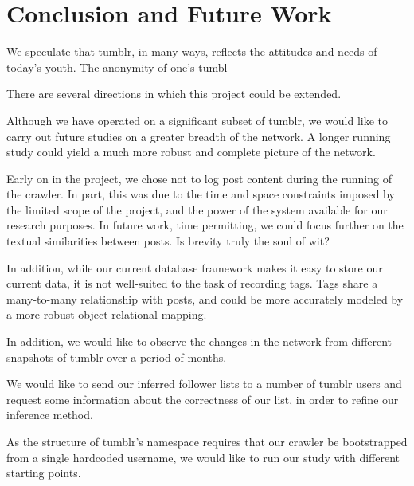\section{Conclusion and Future Work}
\label{sec:-conc}

We speculate that tumblr, in many ways, reflects the attitudes and 
needs of today's youth.  The anonymity of one's tumbl


There are several directions in which this project could be extended.


Although we have operated on a significant subset of tumblr, we
would like to carry out future studies on a greater breadth of the 
network.  A longer running study could yield a much more robust and 
complete picture of the network.

Early on in the project, we chose not to log post content during the 
running of the crawler.  In part, this was due to the time and space 
constraints imposed by the limited scope of the project, and the power 
of the system available for our research purposes.  In future work, 
time permitting, we could focus further on the textual similarities 
between posts.  Is brevity truly the soul of wit?

In addition, while our current database framework makes it easy to store 
our current data, it is not well-suited to the task of recording tags.  
Tags share a many-to-many relationship with posts, and could be more 
accurately modeled by a more robust object relational mapping.


In addition, we would like to observe the changes in the network from 
different snapshots of tumblr over a period of months.

We would like to send our inferred follower lists to a number of 
tumblr users and request some information about the correctness of our 
list, in order to refine our inference method.

As the structure of tumblr's namespace requires that our crawler be 
bootstrapped from a single hardcoded username, we would like to run our 
study with different starting points.


